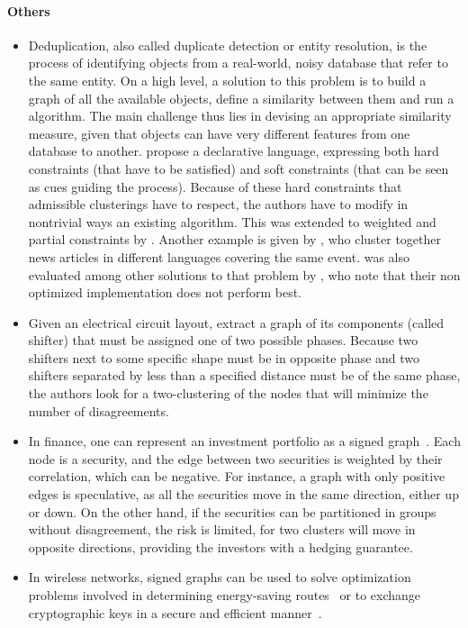       \paragraph{Others}
      \begin{itemize}[leftmargin=*]
	 \item
	    Deduplication, also called duplicate detection or entity resolution, is the process
	    of identifying objects from a real-world, noisy database that refer to the same entity.
	    On a high level, a solution to this problem is to build a graph of all the available
	    objects, define a similarity between them and run a \pcc{} algorithm.
	    The main challenge
	    thus lies in devising an appropriate similarity measure, given that objects can have very
	    different features from one database to another. \Textcite{LargeScaleDeDup09} propose a
	    declarative language, expressing both hard constraints (that have to be satisfied) and
	    soft constraints (that can be seen as cues guiding the process). Because of these hard
	    constraints that admissible clusterings have to respect, the authors have to modify in
	    nontrivial ways an existing \pcc{} algorithm. This was extended to weighted and partial
	    constraints  by \textcite{WeightedER14}. Another example is given by
	    \textcite{Crosslingual07}, who cluster together news articles in different languages
	    covering the same event. \pcc{} was also evaluated among other
	    solutions to that problem by \textcite{DeDup09}, who note that their non optimized
	    implementation does not perform best.
	 \item 
	    Given an electrical circuit layout, \textcite{circuitDesign07} extract a graph of its
	    components (called shifter) that must be assigned one of two possible phases. Because
	    two shifters next to some specific shape must be in opposite phase and two shifters
	    separated by less than a specified distance must be of the same phase, the authors look
	    for a two-clustering of the nodes that will minimize the number of disagreements.
	 \item In finance, one can represent an investment portfolio as a signed
	    graph~\autocite{portfolio02}. Each node is a security, and the edge between two
	    securities is weighted by their correlation, which can be negative. For instance, a
	    graph with only positive edges is speculative, as all the securities move in the same
	    direction, either up or down. On the other hand, if the securities can be partitioned in
	    groups without disagreement, the risk is limited, for two clusters will move in opposite
	    directions, providing the investors with a hedging guarantee.
	 \item In wireless networks, signed graphs can be used to solve optimization problems
	    involved in determining energy-saving routes~\autocite{signedRouting12} or to exchange
	    cryptographic keys in a secure and efficient manner~\autocite{signedKey17}.
      \end{itemize}
